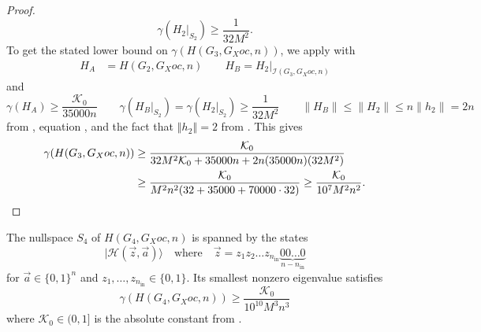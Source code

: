 \documentclass[../thesis-main/thesis-main]{subfiles}
\begin{document}
\begin{proof}
\begin{equation}
  \gamma(H_{2}|_{S_{2}}) \geq \frac{1}{32M^{2}}.\label{eq:gamma_HB}
\end{equation}
To get the stated lower bound on $\gamma(H(G_{3},G_Xoc,n))$, we apply  with 
\begin{align*}
  H_{A} &= H(G_{2},G_Xoc,n) \qquad H_{B}=H_{2}|_{\mathcal{I}(G_{3},G_Xoc,n)}
\end{align*}
and 
\begin{equation}
  \gamma(H_{A}) \geq \frac{\mathcal{K}_0}{35000 n} \qquad
  \gamma(H_{B}|_{S_{2}}) = \gamma(H_{2}|_{S_{2}}) 
  \geq \frac{1}{32 M^{2}} \qquad
  \|H_{B}\| \leq \|H_{2}\| \leq n \|h_{2}\| = 2n
\label{eq:gamma_HA}
\end{equation}
from , equation , and the fact that $\left\Vert h_{2}\right\Vert =2$ from . This gives 
\begin{align*}
  \gamma(H(G_3,G_Xoc,n)) 
  &\geq \frac{\mathcal{K}_0}{32M^2\mathcal{K}_0+35000n +2n(35000n)(32M^2)} \\
  &\geq \frac{\mathcal{K}_0}{M^2 n^2(32+35000+70000\cdot32)}
   \geq \frac{\mathcal{K}_0}{10^7 M^2 n^2}. \qedhere
\end{align*}
\end{proof}

\begin{lemma}
\label{lem:G_IV}The nullspace $S_4$ of $H(G_{4},G_Xoc,n)$ is spanned by
the states 
\begin{equation}
|\mathcal{H}\left(\vec{z},\vec{a}\right)\rangle\quad\text{where}\quad\vec{z}=z_{1}z_{2}\ldots z_{n_{\text{in}}}\underbrace{00\ldots0}_{n-n_{\text{in}}}\label{eq:history_states_zero_init}
\end{equation}
for $\vec{a}\in\{0,1\}^{n}$ and $z_{1},\ldots,z_{n_{\text{in}}}\in\{0,1\}$.
Its smallest nonzero eigenvalue satisfies
\[
\gamma(H(G_{4},G_Xoc,n)) \geq \frac{\mathcal{K}_0}{10^{10} M^3n^3}
\]
where $\mathcal{K}_0\in (0,1]$ is the absolute constant from .
\end{lemma}
\end{document}
